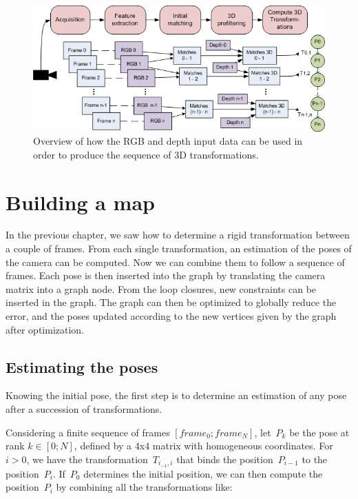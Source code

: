 \begin{figure}[H]
\centering
\includegraphics[width=1.0\textwidth]{figures/overview_rgb_depth}
\caption{Overview of how the RGB and depth input data can be used in order to produce the sequence of 3D transformations.}
\end{figure}

\chapter{Building a map}
\label{chap:map}

In the previous chapter, we saw how to determine a rigid transformation between a couple of frames. From each single transformation, an estimation of the poses of the camera can be computed. Now we can combine them to follow a sequence of frames. Each pose is then inserted into the graph by translating the camera matrix into a graph node. From the loop closures, new constraints can be inserted in the graph. The graph can then be optimized to globally reduce the error, and the poses updated according to the new vertices given by the graph after optimization.

\section{Estimating the poses}

Knowing the initial pose, the first step is to determine an estimation of any pose after a succession of transformations.

Considering a finite sequence of frames $[frame_0 ; frame_N]$, let~$P_k$ be the pose at rank $k \in [0;N]$, defined by a 4x4 matrix with homogeneous coordinates. For~$i>0$, we have the transformation~$T_{i_{-1},i}$ that binds the position~$P_{i-1}$ to the position~$P_i$. If~$P_0$ determines the initial position, we can then compute the position~$P_i$  by combining all the transformations like:

